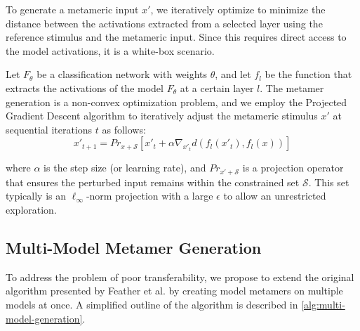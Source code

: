 \documentclass[pdflatex,sn-mathphys-num]{sn-jnl}%
\theoremstyle{thmstyleone}%
\theoremstyle{thmstyletwo}%
\theoremstyle{thmstylethree}%
\begin{document}
To generate a metameric input $x'$, we iteratively optimize to minimize the distance between the activations extracted from a selected layer using the reference stimulus and the metameric input. Since this requires direct access to the model activations, it is a white-box scenario.

Let $F_\theta$ be a classification network with weights $\theta$, and let  $f_l$ be the function that extracts the activations of the model $F_\theta$ at a certain layer $l$.
The metamer generation is a non-convex optimization  problem, and we employ the Projected Gradient Descent algorithm to iteratively adjust the metameric stimulus $x'$ at sequential iterations $t$ as follows:
\begin{equation*}
\label{eq:pgd}
    x'_{t+1} = Pr_{x + \mathcal{S}} \left[ x'_t + \alpha \nabla_{x'_t} d(f_l(x'_t), f_l(x)) \right]
\end{equation*}

where $\alpha$ is the step size (or learning rate), and $Pr_{x' + \mathcal{S}}$ is a projection operator that ensures the perturbed input remains within the constrained set $\mathcal{S}$. This set typically is an $\ell_\infty$-norm  projection with a large $\epsilon$ to allow an unrestricted exploration.




\subsection{Multi-Model Metamer Generation}

To address the problem of poor transferability, we propose to extend the original algorithm presented by Feather et al. \cite{feather_metamers_2019} by creating model metamers on multiple models at once.
A simplified outline of the algorithm is described in \cref{alg:multi-model-generation}.
\end{document}
